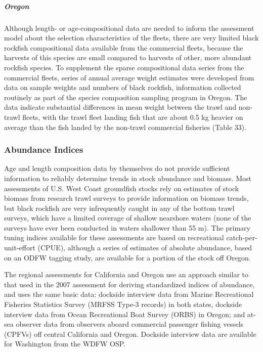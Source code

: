 \documentclass[11pt,
  english,
  letterpaper,
]{article}
\begin{document}
\hypertarget{oregon}{%
\subparagraph{Oregon}\label{oregon}}

Although length- or age-compositional data are needed to inform the assessment model about the selection characteristics of the fleets, there are very limited black rockfish compositional data available from the commercial fleets, because the harvests of this species are small compared to harvests of other, more abundant rockfish species. To supplement the sparse compositional data series from the commercial fleets, series of annual average weight estimates were developed from data on sample weights and numbers of black rockfish, information collected routinely as part of the species composition sampling program in Oregon. The data indicate substantial differences in mean weight between the trawl and non-trawl fleets, with the trawl fleet landing fish that are about 0.5 kg heavier on average than the fish landed by the non-trawl commercial fisheries (Table 33).

\hypertarget{abundance-indices}{%
\subsubsection{Abundance Indices}\label{abundance-indices}}

Age and length composition data by themselves do not provide sufficient information to reliably determine trends in stock abundance and biomass. Most assessments of U.S. West Coast groundfish stocks rely on estimates of stock biomass from research trawl surveys to provide information on biomass trends, but black rockfish are very infrequently caught in any of the bottom trawl surveys, which have a limited coverage of shallow nearshore waters (none of the surveys have ever been conducted in waters shallower than 55 m). The primary tuning indices available for these assessments are based on recreational catch-per-unit-effort (CPUE), although a series of estimates of absolute abundance, based on an ODFW tagging study, are available for a portion of the stock off Oregon.

The regional assessments for California and Oregon use an approach similar to that used in the 2007 assessment for deriving standardized indices of abundance, and uses the same basic data: dockside interview data from Marine Recreational Fisheries Statistics Survey (MRFSS Type-3 records) in both states, dockside interview data from Ocean Recreational Boat Survey (ORBS) in Oregon; and at-sea observer data from observers aboard commercial passenger fishing vessels (CPFVs) off central California and Oregon. Dockside interview data are available for Washington from the WDFW OSP.
\end{document}
